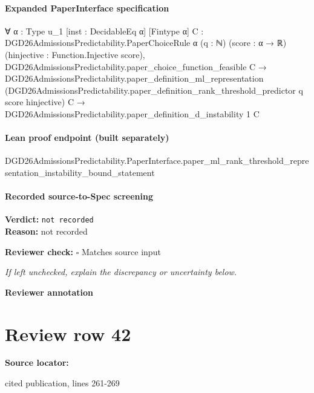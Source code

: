 \documentclass[10pt]{article}
\newcommand{\reviewerbox}{%
  \par\noindent\fbox{\parbox{0.96\linewidth}{\rule{0pt}{0.38in}}}\par
}
\newcommand{\reviewmatch}[1]{%
  \par\noindent\textbf{Reviewer check:} $\square$\; #1\par
  \noindent\emph{If left unchecked, explain the discrepancy or uncertainty below.}\par
}
\begin{document}
\paragraph{Expanded PaperInterface specification}
\begin{ReviewVerbatim}
∀ {α : Type u_1} [inst : DecidableEq α] [Fintype α] {C : DGD26AdmissionsPredictability.PaperChoiceRule α} (q : ℕ)
  (score : α → ℝ) (hinjective : Function.Injective score),
  DGD26AdmissionsPredictability.paper_choice_function_feasible C →
    DGD26AdmissionsPredictability.paper_definition_ml_representation
        (DGD26AdmissionsPredictability.paper_definition_rank_threshold_predictor q score hinjective) C →
      DGD26AdmissionsPredictability.paper_definition_d_instability 1 C
\end{ReviewVerbatim}

\paragraph{Lean proof endpoint (built separately)}\begin{ReviewVerbatim}
DGD26AdmissionsPredictability.PaperInterface.paper_ml_rank_threshold_representation_instability_bound_statement
\end{ReviewVerbatim}

\paragraph{Recorded source-to-Spec screening}
\textbf{Verdict:} \texttt{not recorded}
\\
\textbf{Reason:} not recorded
\reviewmatch{Matches source input}
\noindent\textbf{Reviewer annotation}\par
\reviewerbox
\clearpage
\hypertarget{source-claim-98ed151e7543b81d}{}
\section*{Review row 42}
\textbf{Source locator:} {\footnotesize\raggedright cited publication, lines 261-\allowbreak{}269\par}
\end{document}

